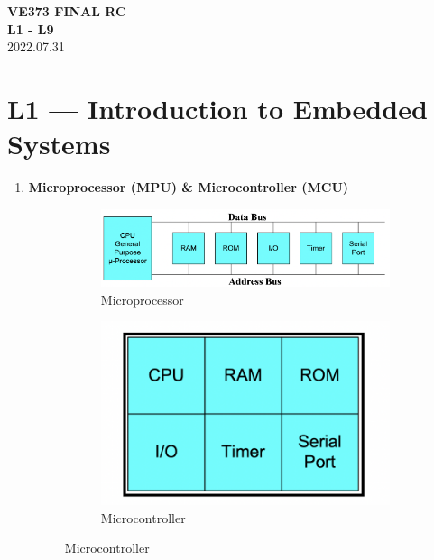 \documentclass[a4paper]{article}
\begin{document}
\renewcommand{\thesection}{\Roman{section}}
\renewcommand{\thesubsection}{\Alph{subsection}}
\renewcommand{\thesubsubsection}{\thesubsection.\arabic{subsubsection}}
\renewcommand{\d}{\: \mathrm{d}}
\newcommand{\e}{\mathrm{e}}

\begin{center}
  \textbf{\Large VE373 FINAL RC}\\[1em]
  \textbf{\large L1 - L9} \\[1em]
  2022.07.31 \\[1em]
\end{center}

\section*{L1 --- Introduction to Embedded Systems}
  \begin{enumerate}[label = \arabic*.]
    \item \textbf{Microprocessor (MPU) \& Microcontroller (MCU)}
      \begin{figure}[H]
        \centering
        \begin{subfigure}[b]{0.65\linewidth}
          \centering
          \includegraphics[width=0.9\linewidth]{MPU.png}
          \caption{Microprocessor}
          \label{subfig:MPU.png}
        \end{subfigure}
        \begin{subfigure}[b]{0.3\linewidth}
          \centering
          \includegraphics[width=0.9\linewidth]{MCU.png}
          \caption{Microcontroller}
          \label{subfig:MCU.png}
        \end{subfigure}
      \end{figure}


\end{enumerate}
\end{document}
